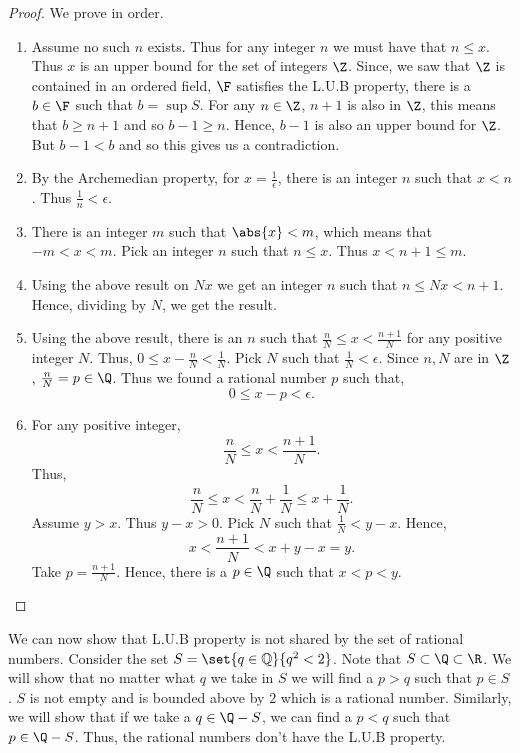 \begin{proof}
    We prove in order. 
    \begin{enumerate}
	\item
	    Assume no such $n$ exists. Thus for any integer $n$ we must have that $n \leq x$. Thus $x$ is an
	    upper bound for the set of integers $\Z$. Since, we saw that $\Z$ is contained in an ordered
	    field, $\F$ satisfies the L.U.B property, there is a $b \in \F$ such that $b = \sup{S}$. For any
	    $n \in \Z$, $n+1$ is also in $\Z$, this means that $b \geq n+1$ and so $b - 1 \geq n$. Hence,
	    $b-1$ is also an upper bound for $\Z$. But $b -1 < b$ and so this gives us a contradiction.
	\item
	    By the Archemedian property, for $x = \frac{1}{\epsilon}$, there is an integer $n$ such that $x <
	    n$. Thus $\frac{1}{n} < \epsilon$.
	\item
	    There is an integer $m$ such that $\abs{x} < m$, which means that $-m < x < m$. Pick an integer
	    $n$ such that $n \leq x$. Thus $x < n+1 \leq m$. 
	\item
	    Using the above result on $Nx$ we get an integer $n$ such that $n\leq Nx < n+1$. Hence, dividing
	    by $N$, we get the result.
	\item
	    Using the above result, there is an $n$ such that $ \frac{n}{N} \leq x < \frac{n+1}{N}$ for any
	    positive integer $N$. Thus, $0 \leq x - \frac{n}{N} < \frac{1}{N}$. Pick $N$ such that
	    $\frac{1}{N} < \epsilon$. Since $n,N$ are in $\Z$, $\frac{n}{N} = p \in \Q$. Thus we found a
	    rational number $p$ such that,
	    \[0 \leq x - p < \epsilon.\]
	\item
	    For any positive integer,
	    \[\frac{n}{N} \leq x < \frac{n+1}{N}.\]
	    Thus,
	    \[\frac{n}{N} \leq x < \frac{n}{N} + \frac{1}{N} \leq x + \frac{1}{N}.\]
	    Assume $y > x$. Thus $y-x > 0$. Pick $N$ such that $\frac{1}{N} < y-x$. Hence,
	    \[x < \frac{n+1}{N} < x + y-x = y.\]
	    Take $p = \frac{n+1}{N}$. Hence, there is a $p \in \Q$ such that $x < p < y$.
    \end{enumerate}
\end{proof}
We can now show that L.U.B property is not shared by the set of rational numbers.
Consider the set  $S = \set{q \in \mathbb{Q}}{q^2 < 2}$. Note that $S \subset \Q \subset \R$. We will show
that no matter what $q$ we take in $S$ we will find a $p > q$ such that $p \in S$. $S$ is not empty and is
bounded above by $2$ which is a rational number. Similarly, we will show that if we take a  $q \in \Q - S$, we
can find a $p < q$ such that $p \in \Q - S$. Thus, the rational numbers don't have the L.U.B property. 


